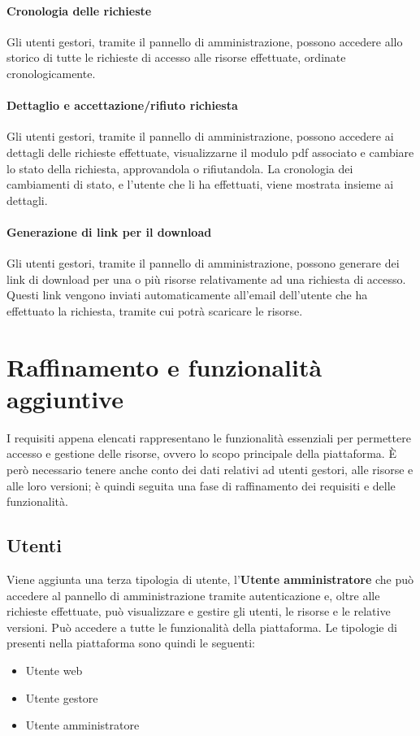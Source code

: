\paragraph{Cronologia delle richieste}
Gli utenti gestori, tramite il pannello di amministrazione, possono accedere allo
storico di tutte le richieste di accesso alle risorse effettuate, ordinate
cronologicamente.

\paragraph{Dettaglio e accettazione/rifiuto richiesta}
Gli utenti gestori, tramite il pannello di amministrazione, possono accedere ai
dettagli delle richieste effettuate, visualizzarne il modulo pdf associato e
cambiare lo stato della richiesta, approvandola o rifiutandola.
La cronologia dei cambiamenti di stato, e l'utente che li ha effettuati, viene
mostrata insieme ai dettagli.

\paragraph{Generazione di link per il download}
Gli utenti gestori, tramite il pannello di amministrazione, possono generare dei
link di download per una o più risorse relativamente ad una richiesta di accesso.
Questi link vengono inviati automaticamente all'email dell'utente che ha effettuato
la richiesta, tramite cui potrà scaricare le risorse.



\section{Raffinamento e funzionalità aggiuntive}
I requisiti appena elencati rappresentano le funzionalità essenziali per permettere
accesso e gestione delle risorse, ovvero lo scopo principale della piattaforma.
È però necessario tenere anche conto dei dati relativi ad utenti gestori, alle
risorse e alle loro versioni; è quindi seguita una fase di raffinamento dei
requisiti e delle funzionalità.


\subsection{Utenti}
Viene aggiunta una terza tipologia di utente, l'\textbf{Utente amministratore}
che può accedere al pannello di amministrazione tramite autenticazione e, oltre
alle richieste effettuate, può visualizzare e gestire gli utenti, le risorse e
le relative versioni. Può accedere a tutte le funzionalità della piattaforma.
Le tipologie di presenti nella piattaforma sono quindi le seguenti:
\begin{itemize}
	\item Utente web
	\item Utente gestore
	\item Utente amministratore
\end{itemize}


